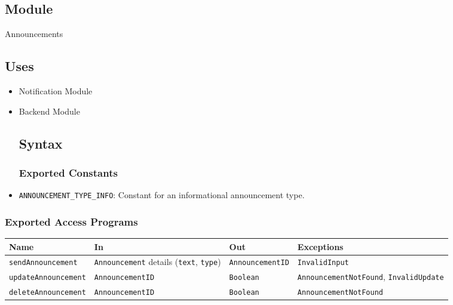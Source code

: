 \documentclass[12pt, titlepage]{article}
\begin{document}
\subsection{Module}
Announcements

\subsection{Uses}
\begin{itemize}
  \item Notification Module
  \item Backend Module

        \subsection{Syntax}

        \subsubsection{Exported Constants}
  \item \texttt{ANNOUNCEMENT\_TYPE\_INFO}: Constant for an informational announcement type.
\end{itemize}

\subsubsection{Exported Access Programs}
\begin{center}
  \begin{tabular}{p{4cm} p{4cm} p{3.5cm} p{4.5cm}}
    \toprule
    \textbf{Name}               & \textbf{In}                                                  & \textbf{Out}            & \textbf{Exceptions}                                   \\
    \midrule
    \texttt{sendAnnouncement}   & \texttt{Announcement} details (\texttt{text}, \texttt{type}) & \texttt{AnnouncementID} & \texttt{InvalidInput}                                 \\
    \texttt{updateAnnouncement} & \texttt{AnnouncementID}                                      & \texttt{Boolean}        & \texttt{AnnouncementNotFound}, \texttt{InvalidUpdate} \\
    \texttt{deleteAnnouncement} & \texttt{AnnouncementID}                                      & \texttt{Boolean}        & \texttt{AnnouncementNotFound}                         \\
    \bottomrule
  \end{tabular}
\end{center}
\end{document}
